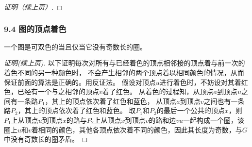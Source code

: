 \documentclass{beamer}
\begin{document}
\begin{CJK}{UTF8}{gbsn}
\begin{frame}
\begin{proof}[证明（续上页）]
  \end{proof}
\end{frame}
\begin{frame}
  \frametitle{9.4 图的顶点着色}
  \begin{theorem9.4.1}
    一个图是可双色的当且仅当它没有奇数长的圈。
  \end{theorem9.4.1}
  \begin{proof}[证明(续上页)]
    以下证明每次对所有与已经着色的顶点相邻接的顶点着与前一次的着色不同的另一种颜色时，
不会产生相邻的两个顶点着以相同颜色的情况，从而保证前面的算法是正确的。用反证法。
假设对顶点$u$进行着色时，不妨设对其着红色，已经有一个与之相邻的顶点$v$着了红色。
从着色的过程知，从顶点$a$到顶点$u$之间有一条路$P_1$，其上的顶点依次着了红色和蓝色，
从顶点$a$到顶点$v$之间也有一条路$P_2$，其上的顶点依次着了红色和蓝色。
取$P_1$和$P_2$的最后一个公共的顶点$x$，则$P_1$上从顶点$u$到顶点$x$的路与$P_2$上从顶点$x$到顶点$v$的路和边$vu$一起构成一个圈，该圈上$u$和$v$着相同的颜色，其他各顶点依次着不同的颜色，因此其长度为奇数，与$G$中没有奇数长的圈矛盾。 
  \end{proof}
\end{frame}


\end{CJK}
\end{document}

